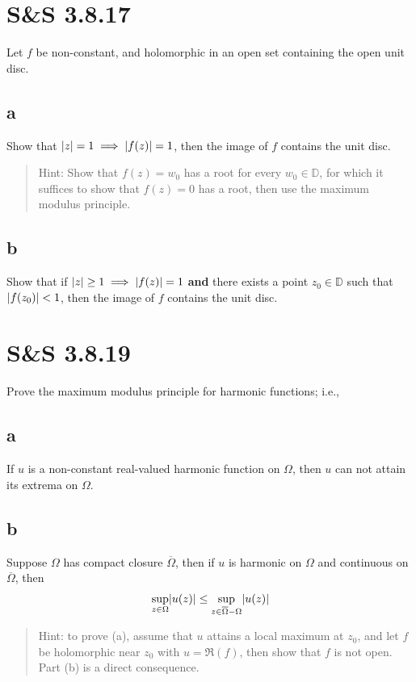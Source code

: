 \documentclass{scrreport}
\DeclarePairedDelimiter\abs{\lvert}{\rvert}%
\begin{document}
\section{S&S 3.8.17}
Let $f$ be non-constant, and holomorphic in an open set containing the open unit disc.

\subsection{a}
Show that $\abs{z} = 1 \implies \abs{f(z)} = 1$, then the image of $f$ contains the unit disc.

\begin{quote}
    Hint: Show that $f(z) = w_0$ has a root for every $w_0 \in \mathbb{D}$, for which it suffices to show that $f(z) = 0$ has a root, then use the maximum modulus principle.
\end{quote}

\subsection{b}
Show that if $\abs{z} \geq 1 \implies \abs{f(z)} = 1$ \textbf{and} there exists a point $z_0 \in \mathbb{D}$ such that $\abs{f(z_0)} < 1$, then the image of $f$ contains the unit disc.

\section{S&S 3.8.19}

Prove the maximum modulus principle for harmonic functions; i.e.,

\subsection{a}
If $u$ is a non-constant real-valued harmonic function on $\Omega$, then $u$ can not attain its extrema on $\Omega$.

\subsection{b}
Suppose $\Omega$ has compact closure $\overline \Omega$, then if $u$ is harmonic on $\Omega$ and continuous on $\overline \Omega$, then
\begin{align}
    \sup_{z\in \Omega} \abs{u(z)} \leq \sup_{z\in \overline \Omega - \Omega} \abs{u(z)}
\end{align}

\begin{quote}
    Hint: to prove (a), assume that $u$ attains a local maximum at $z_0$, and let $f$ be holomorphic near $z_0$ with $u = \Re(f)$, then show that $f$ is not open.
    Part (b) is a direct consequence.
\end{quote}
\end{document}
